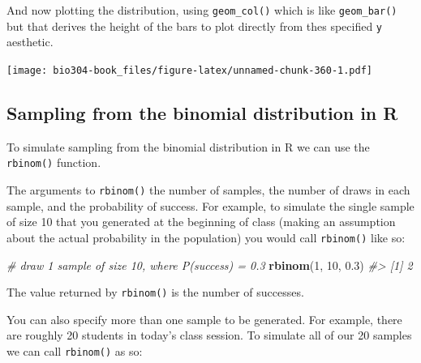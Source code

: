 \documentclass[]{book}
\newenvironment{Shaded}{\begin{snugshade}}{\end{snugshade}}
\newcommand{\CommentTok}[1]{\textcolor[rgb]{0.56,0.35,0.01}{\textit{#1}}}
\newcommand{\DataTypeTok}[1]{\textcolor[rgb]{0.13,0.29,0.53}{#1}}
\newcommand{\DecValTok}[1]{\textcolor[rgb]{0.00,0.00,0.81}{#1}}
\newcommand{\FloatTok}[1]{\textcolor[rgb]{0.00,0.00,0.81}{#1}}
\newcommand{\KeywordTok}[1]{\textcolor[rgb]{0.13,0.29,0.53}{\textbf{#1}}}
\newcommand{\NormalTok}[1]{#1}
\newcommand{\OperatorTok}[1]{\textcolor[rgb]{0.81,0.36,0.00}{\textbf{#1}}}
\newcommand{\StringTok}[1]{\textcolor[rgb]{0.31,0.60,0.02}{#1}}
\theoremstyle{definition}
\theoremstyle{definition}
\theoremstyle{definition}
\theoremstyle{remark}
\begin{document}
And now plotting the distribution, using \texttt{geom\_col()} which is
like \texttt{geom\_bar()} but that derives the height of the bars to
plot directly from thes specified \texttt{y} aesthetic.

\begin{Shaded}
\end{Shaded}

\texttt{[image: bio304-book\_files/figure-latex/unnamed-chunk-360-1.pdf]}

\hypertarget{sampling-from-the-binomial-distribution-in-r}{%
\subsection{Sampling from the binomial distribution in
R}\label{sampling-from-the-binomial-distribution-in-r}}

To simulate sampling from the binomial distribution in R we can use the
\texttt{rbinom()} function.

The arguments to \texttt{rbinom()} the number of samples, the number of
draws in each sample, and the probability of success. For example, to
simulate the single sample of size 10 that you generated at the
beginning of class (making an assumption about the actual probability in
the population) you would call \texttt{rbinom()} like so:

\begin{Shaded}
\begin{Highlighting}[]
\CommentTok{# draw 1 sample of size 10, where P(success) = 0.3}
\KeywordTok{rbinom}\NormalTok{(}\DecValTok{1}\NormalTok{, }\DecValTok{10}\NormalTok{, }\FloatTok{0.3}\NormalTok{)}
\CommentTok{#> [1] 2}
\end{Highlighting}
\end{Shaded}

The value returned by \texttt{rbinom()} is the number of successes.

You can also specify more than one sample to be generated. For example,
there are roughly 20 students in today's class session. To simulate all
of our 20 samples we can call \texttt{rbinom()} as so:
\end{document}

